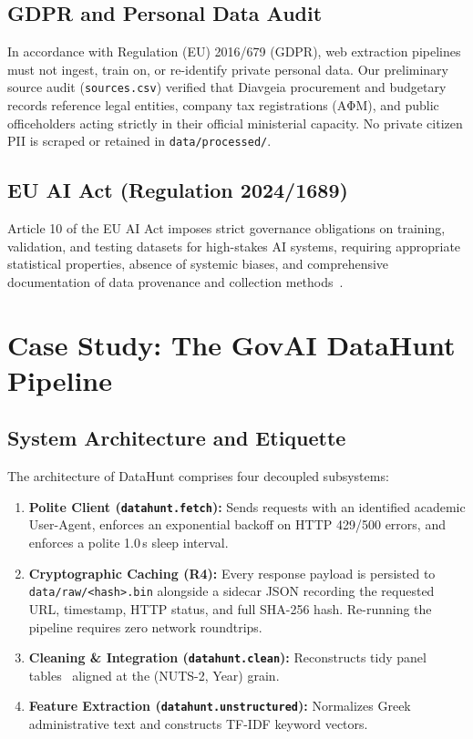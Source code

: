 \documentclass[11pt,a4paper]{article}
\begin{document}
\subsection{GDPR and Personal Data Audit}
In accordance with Regulation (EU) 2016/679 (GDPR), web extraction pipelines must not ingest, train on, or re-identify private personal data. Our preliminary source audit (\texttt{sources.csv}) verified that Diavgeia procurement and budgetary records reference legal entities, company tax registrations (ΑΦΜ), and public officeholders acting strictly in their official ministerial capacity. No private citizen PII is scraped or retained in \texttt{data/processed/}.

\subsection{EU AI Act (Regulation 2024/1689)}
Article 10 of the EU AI Act imposes strict governance obligations on training, validation, and testing datasets for high-stakes AI systems, requiring appropriate statistical properties, absence of systemic biases, and comprehensive documentation of data provenance and collection methods~\citep{eu2024aiact}.

\section{Case Study: The GovAI DataHunt Pipeline}
\subsection{System Architecture and Etiquette}
The architecture of DataHunt comprises four decoupled subsystems:
\begin{enumerate}
    \item \textbf{Polite Client (\texttt{datahunt.fetch}):} Sends requests with an identified academic User-Agent, enforces an exponential backoff on HTTP 429/500 errors, and enforces a polite 1.0\,s sleep interval.
    \item \textbf{Cryptographic Caching (R4):} Every response payload is persisted to \texttt{data/raw/<hash>.bin} alongside a sidecar JSON recording the requested URL, timestamp, HTTP status, and full SHA-256 hash. Re-running the pipeline requires zero network roundtrips.
    \item \textbf{Cleaning \& Integration (\texttt{datahunt.clean}):} Reconstructs tidy panel tables~\citep{wickham2014tidy} aligned at the (NUTS-2, Year) grain.
    \item \textbf{Feature Extraction (\texttt{datahunt.unstructured}):} Normalizes Greek administrative text and constructs TF-IDF keyword vectors.
\end{enumerate}
\end{document}
